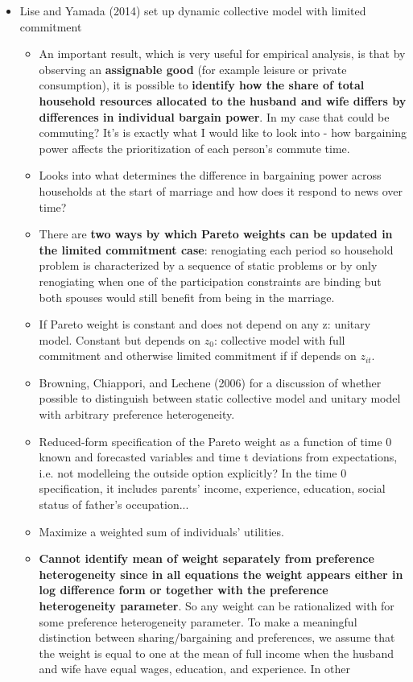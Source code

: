 \begin{itemize}
\begin{itemize}
\end{itemize}
\item Lise and Yamada (2014) set up dynamic collective model with limited commitment
\begin{itemize}
\item An important result, which is very useful for empirical analysis, is that by observing an \textbf{assignable good}
(for example leisure or private consumption), it is possible to \textbf{identify how the share of total household resources allocated to the husband and wife differs by differences in individual bargain power}. In my case that could be commuting? It's is exactly what I would like to look into - how bargaining power affects the prioritization of each person's commute time.
\item Looks into what determines the difference in bargaining power across households at the start of marriage and how does it respond to news over time?
\item There are \textbf{two ways by which Pareto weights can be updated in the limited commitment case}: renogiating each period so household problem is characterized by a sequence of static problems or by only renogiating when one of the participation constraints are binding but both spouses would still benefit from being in the marriage.
\item If Pareto weight is constant and does not depend on any z: unitary model. Constant but depends on $z_0$: collective model with full commitment and otherwise limited commitment if if depends on $z_{it}$.
\item Browning, Chiappori, and Lechene (2006) for a discussion of whether possible to distinguish between static collective model and unitary model with arbitrary preference heterogeneity.
\item Reduced-form specification of the Pareto weight as a function of time 0 known and forecasted variables and time t deviations from expectations, i.e. not modelleing the outside option explicitly? In the time 0 specification, it includes parents' income, experience, education, social status of father's occupation...
\item Maximize a weighted sum of individuals' utilities.
\item \textbf{Cannot identify mean of weight separately from preference heterogeneity since in all equations the weight appears either in log difference form or together with the preference heterogeneity parameter}. So any weight can be rationalized with for some preference heterogeneity parameter. To make a meaningful distinction between sharing/bargaining and preferences, we assume that the weight is equal to one at the mean of full income when the husband and wife have equal wages, education, and experience. In other

\end{itemize}
\end{itemize}
